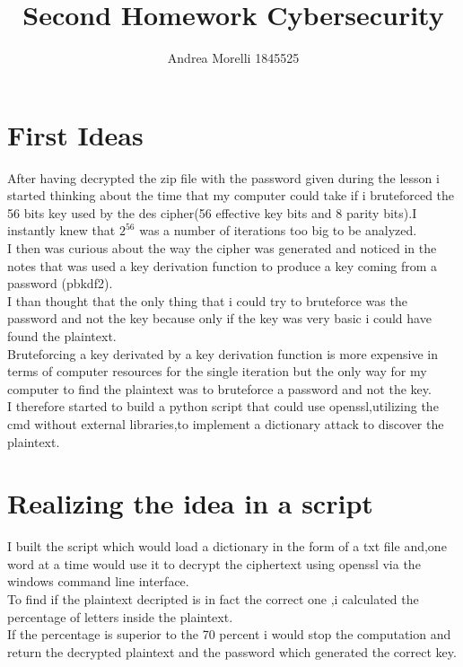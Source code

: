 \documentclass{article}
\title{Second Homework Cybersecurity}
\author{Andrea Morelli 1845525}
\date{}
\begin{document}
\maketitle

\section{First Ideas}
After having decrypted the zip file with the password given during the lesson i started thinking about the time that my computer could take if i bruteforced the 56 bits key used by the des cipher(56 effective key bits and 8 parity bits).I instantly knew that $2^{56}$ was a number of iterations too big to be analyzed.\\I then was curious about the way the cipher was generated and noticed in the notes that was used a key derivation function to produce a key coming from a password (pbkdf2).\\I than thought that the only thing that i could try to bruteforce was the password and not the key because only if the key was very basic i could have found the plaintext.\\Bruteforcing a key derivated by a key derivation function is more expensive in terms of computer resources for the single iteration but the only way for my computer to find the plaintext was to bruteforce a password and not the key.\\I therefore started to build a python script that could use openssl,utilizing the cmd without external libraries,to implement a dictionary attack to discover the plaintext.
\\
\section{Realizing the idea in a script}
I built the script which would load a dictionary in the form of a txt file and,one word at a time would use it to decrypt the ciphertext using openssl via the windows command line interface.\\To find if the plaintext decripted is in fact the correct one ,i calculated the percentage of letters inside the plaintext.\\If the percentage is superior to the 70 percent i would stop the computation and return the decrypted plaintext and the password which generated the correct key.\\
\end{document}
